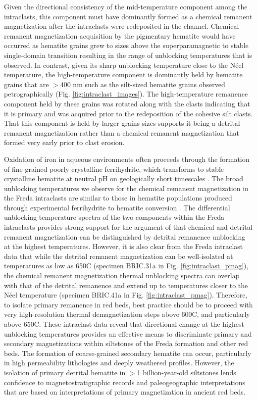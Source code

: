 \documentclass[11pt,letterpaper]{article}
\begin{document}
Given the directional consistency of the mid-temperature component among the intraclasts, this component must have dominantly formed as a chemical remanent magnetization after the intraclasts were redeposited in the channel. Chemical remanent magnetization acquisition by the pigmentary hematite would have occurred as hematite grains grew to sizes above the superparamagnetic to stable single-domain transition resulting in the range of unblocking temperatures that is observed. In contrast, given its sharp unblocking temperature close to the N\'eel temperature, the high-temperature component is dominantly held by hematite grains that are $>$400 nm such as the silt-sized hematite grains observed petrographically (Fig. \ref{fig:intraclast_images}). The high-temperature remanence component held by these grains was rotated along with the clasts indicating that it is primary and was acquired prior to the redeposition of the cohesive silt clasts. That this component is held by larger grains sizes supports it being a detrital remanent magnetization rather than a chemical remanent magnetization that formed very early  prior to clast erosion.

Oxidation of iron in aqueous environments often proceeds through the formation of fine-grained poorly crystalline ferrihydrite, which transforms to stable crystalline hematite at neutral pH on geologically short timescales \citep{Cudennec2006a}. The broad unblocking temperatures we observe for the chemical remanent magnetization in the Freda intraclasts are similar to those in hematite populations produced through experimental ferrihydrite to hematite conversion \citep{Jiang2015a}. The differential unblocking temperature spectra of the two components within the Freda intraclasts provides strong support for the argument of \cite{Jiang2015a} that chemical and detrital remanent magnetization can be distinguished by detrital remanence unblocking at the highest temperatures. However, it is also clear from the Freda intraclast data that while the detrital remanent magnetization can be well-isolated at temperatures as low as 650\textdegree C (specimen BRIC.31a in Fig. \ref{fig:intraclast_pmag}), the chemical remanent magnetization thermal unblocking spectra can overlap with that of the detrital remanence and extend up to temperatures closer to the N\'eel temperature (specimen BRIC.41a in Fig. \ref{fig:intraclast_pmag}). Therefore, to isolate primary remanence in red beds, best practice should be to proceed with very high-resolution thermal demagnetization steps above 600\textdegree C, and particularly above 650\textdegree C. These intraclast data reveal that directional change at the highest unblocking temperatures provides an effective means to discriminate primary and secondary magnetizations within siltstones of the Freda formation and other red beds. The formation of coarse-grained secondary hematite can occur, particularly in high permeability lithologies and deeply weathered profiles. However, the isolation of primary detrital hematite in $>$1 billion-year-old siltstones lends confidence to magnetostratigraphic records and paleogeographic interpretations that are based on interpretations of primary magnetization in ancient red beds. 
\end{document}
